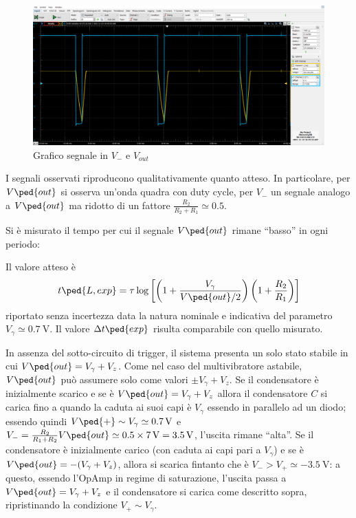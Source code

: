 \documentclass[10pt,a4paper]{article}
\begin{document}
\begin{figure}[htbp]
\centering
\includegraphics[scale=0.42]{monostabileV-}
\caption{Grafico segnale in $V_-$ e $V_{out}$}
\end{figure}

I segnali osservati riproducono qualitativamente quanto atteso.
In particolare, per $ V \ped{out} $ si osserva un'onda quadra con duty cycle,
per $ V_{-} $ un segnale analogo a $ V\ped{out} $ ma ridotto di un fattore
$\frac{R_2}{R_2 + R_1} \simeq 0.5 $.

Si è misurato il tempo per cui il segnale $ V \ped{out} $ rimane ``basso'' in ogni periodo:

Il valore atteso è
\begin{equation} \label{eq: mstable}
t\ped{L, exp} =
\tau \log\left[\left(1 + \frac{V_\gamma}{V \ped{out}/2}\right)
\left(1 + \frac{R_2}{R_1}\right)\right]
\end{equation}
riportato senza incertezza data la natura nominale e indicativa del parametro $ V_{\gamma} \simeq \SI{0.7}{\volt} $. Il valore $ \Delta t \ped{exp} $ risulta comparabile con quello misurato.

In assenza del sotto-circuito di trigger, il sistema presenta un solo stato stabile in cui $ V\ped{out} =  V_{\gamma} + V_{z} $.
Come nel caso del multivibratore astabile, $ V\ped{out} $ può assumere solo come valori $ \pm V_{\gamma} + V_{z} $.
Se il condensatore è inizialmente scarico e se è $ V\ped{out} = V_{\gamma} + V_{z} $ allora il condensatore $ C $ si carica fino a quando la caduta ai suoi capi è $ V_{\gamma} $ essendo in parallelo ad un diodo; essendo quindi $ V\ped{+} \sim V_{\gamma} \simeq \SI{0.7}{\volt} $ e $ V_{-} = \frac{R_{2}}{R_{1} + R_{2}} V\ped{out} \simeq 0.5 \times \SI{7}{\volt} = \SI{3.5}{\volt} $, l'uscita rimane ``alta''.
Se il condensatore è inizialmente carico (con caduta ai capi pari a $ V_{\gamma} $) e se è $ V\ped{out} = -(V_{\gamma} + V_{z}) $, allora si scarica fintanto che è $ V_{-} > V_{+} \simeq -\SI{3.5}{\volt} $: a questo, essendo l'OpAmp in regime di saturazione, l'uscita passa a $ V\ped{out} = V_{\gamma} + V_{z} $ e il condensatore si carica come descritto sopra, ripristinando la condizione $ V_{+} \sim V_{\gamma} $. \\
\end{document}
